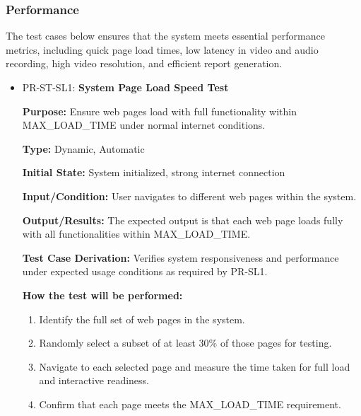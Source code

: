 \documentclass[12pt, titlepage]{article}
\begin{document}
\subsubsection{Performance}
\hspace{2em}The test cases below ensures that the system meets essential performance metrics, 
including quick page load times, low latency in video and audio recording, high video 
resolution, and efficient report generation. 

\begin{itemize}
  \item PR-ST-SL1: \textbf{System Page Load Speed Test}
  \begin{mdframed}[linewidth=0.5mm]
      \textbf{Purpose:} Ensure web pages load with full functionality within MAX\_LOAD\_TIME under normal internet conditions. \par
      \textbf{Type:} Dynamic, Automatic\par
      \textbf{Initial State:} System initialized, strong internet connection \par
      \textbf{Input/Condition:} User navigates to different web pages within the system. \par
      \textbf{Output/Results:} The expected output is that each web page loads fully with all functionalities within MAX\_LOAD\_TIME. \par
      \textbf{Test Case Derivation:} Verifies system responsiveness and performance under expected usage conditions as required by PR-SL1. \par
      \textbf{How the test will be performed:}
      \begin{enumerate}[noitemsep]
        \item Identify the full set of web pages in the system.
        \item Randomly select a subset of at least 30\% of those pages for testing.
        \item Navigate to each selected page and measure the time taken for full load and interactive readiness.
        \item Confirm that each page meets the MAX\_LOAD\_TIME requirement.
      \end{enumerate}
  \end{mdframed}


\end{itemize}
\end{document}
